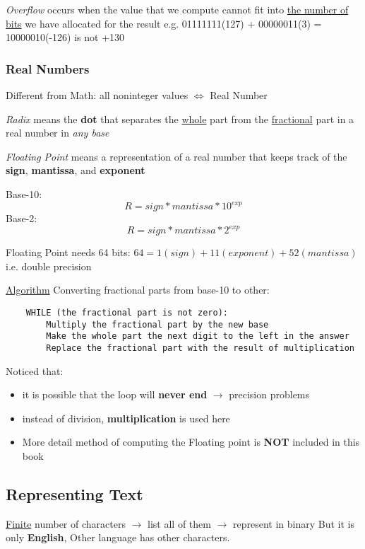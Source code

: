 \documentclass[12pt]{article}
\begin{document}
\emph{Overflow} occurs when the value that we compute cannot fit into \underline{the number of bits} we have allocated for the result\newline
e.g. 01111111(127) + 00000011(3) = 10000010(-126) is not +130

\subsubsection{Real Numbers}
Different from Math: all noninteger values $\Leftrightarrow$ Real Number

\emph{Radix} means the \textbf{dot} that separates the \underline{whole} 
part from the \underline{fractional} part in a real number in \textit{any base}

\emph{Floating Point} means a representation of a real number that keeps track of the \textbf{sign}, \textbf{mantissa}, and \textbf{exponent}

Base-10:
\begin{equation}
    R = sign * mantissa * 10^{exp}
\end{equation}
Base-2:
\begin{equation}
    R = sign * mantissa * 2^{exp}
\end{equation}

Floating Point needs 64 bits: $64 = 1(sign) + 11(exponent) + 52(mantissa)$ i.e. double precision

\underline{Algorithm} Converting fractional parts from base-10 to other:
\begin{lstlisting}
    WHILE (the fractional part is not zero):
        Multiply the fractional part by the new base
        Make the whole part the next digit to the left in the answer
        Replace the fractional part with the result of multiplication
\end{lstlisting}

Noticed that:
\begin{itemize}
    \item it is possible that the loop will \textbf{never end} $\rightarrow$ precision problems
    \item instead of division, \textbf{multiplication} is used here
    \item More detail method of computing the Floating point is \textbf{NOT} included in this book
\end{itemize}

\subsection{Representing Text}
\underline{Finite} number of characters $\rightarrow$ list all of them $\rightarrow$ represent in binary \newline
But it is only \textbf{English}, Other language has other characters.
\end{document}
